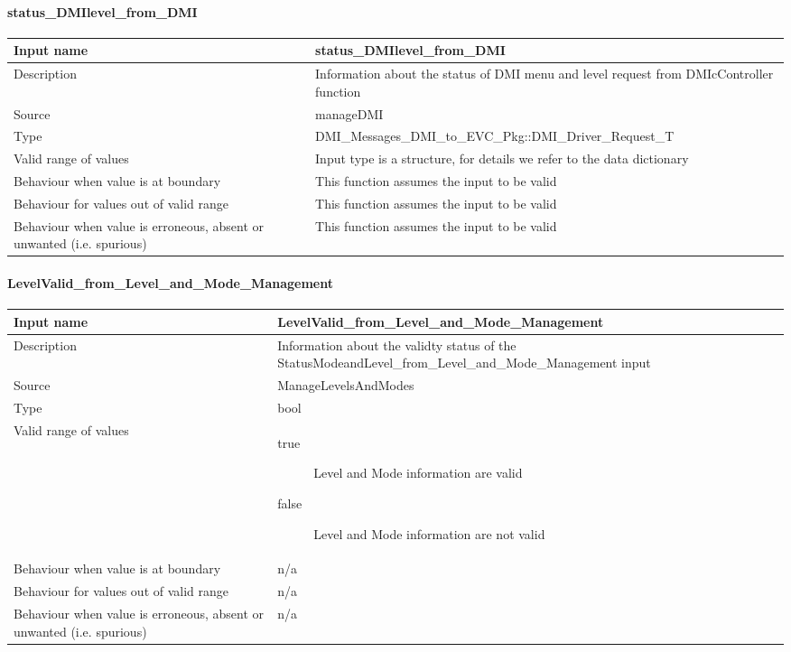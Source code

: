 \paragraph{status\_DMIlevel\_from\_DMI}

\begin{longtable}{p{}p{}}
\toprule
Input name				& status\_DMIlevel\_from\_DMI  \\
\midrule
Description				& Information about the status of DMI menu and level request from DMIcController function \\
\midrule
Source					&  manageDMI\\ 
\midrule
Type					& DMI\_Messages\_DMI\_to\_EVC\_Pkg::DMI\_Driver\_Request\_T \\
\midrule
Valid range of values	& Input type is a structure, for details we refer to the data dictionary \\
\midrule
Behaviour when value is at boundary	& This function assumes the input to be valid \\
\midrule
Behaviour for values out of valid range	& This function assumes the input to be valid\\
\midrule
Behaviour when value is erroneous, absent or unwanted (i.e. spurious) & This function assumes the input to be valid \\
\bottomrule
\end{longtable}

\paragraph{LevelValid\_from\_Level\_and\_Mode\_Management}

\begin{longtable}{p{}p{}}
\toprule
Input name				& LevelValid\_from\_Level\_and\_Mode\_Management  \\
\midrule
Description				& Information about the validty status of  the StatusModeandLevel\_from\_Level\_and\_Mode\_Management input \\
\midrule
Source					& ManageLevelsAndModes \\
\midrule
Type					& bool \\
\midrule
Valid range of values	& \begin{description}
\item[true]Level and Mode information are valid
\item[false]Level and Mode information are not valid
\end{description} \\
\midrule
Behaviour when value is at boundary	& n/a \\
\midrule
Behaviour for values out of valid range	& n/a\\
\midrule
Behaviour when value is erroneous, absent or unwanted (i.e. spurious) & n/a \\
\bottomrule
\end{longtable}

